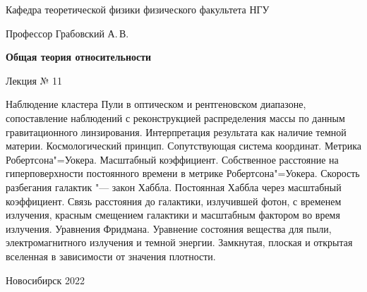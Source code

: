 \documentclass[12pt,pagesize,paper=192mm:108mm,landscape]{scrbook}
\begin{document}
\begin{titlepage}
\begin{center}
    Кафедра теоретической физики физического факультета НГУ

    \Large
    Профессор Грабовский А.\,В.

    \huge
    \textbf{Общая теория относительности}

    \Large
    Лекция № 11
    \vfill

    \small
    \begin{minipage}{0.95\linewidth}
      Наблюдение кластера Пули в оптическом и рентгеновском диапазоне,
      сопоставление наблюдений с реконструкцией распределения массы по
      данным гравитационного линзирования. Интерпретация результата
      как наличие темной материи. Космологический
      принцип. Сопутствующая система координат. Метрика
      Робертсона"=Уокера. Масштабный коэффициент. Собственное
      расстояние на гиперповерхности постоянного времени в метрике
      Робертсона"=Уокера. Скорость разбегания галактик "--- закон
      Хаббла. Постоянная Хаббла через масштабный коэффициент. Связь
      расстояния до галактики, излучившей фотон, с временем излучения,
      красным смещением галактики и масштабным фактором во время
      излучения. Уравнения Фридмана. Уравнение состояния вещества для
      пыли, электромагнитного излучения и темной энергии. Замкнутая,
      плоская и открытая вселенная в зависимости от значения
      плотности.
     \end{minipage}
    \vfill

    \normalsize \ccbysa\hspace{0.5em}  Новосибирск 2022
  \end{center}
\end{titlepage}
\end{document}
